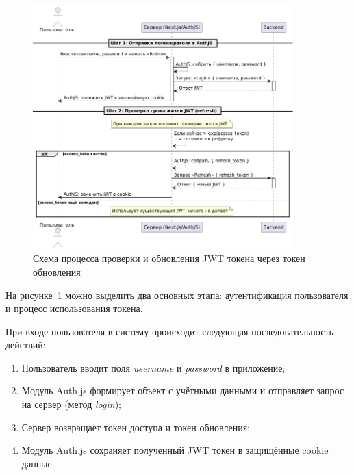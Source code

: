 \begin{figure}[h]
    \centering
    \includegraphics[width=0.9\textwidth]{static/diagrams/AuthRefresh.png}
    \caption{Схема процесса проверки и обновления JWT токена через токен обновления}
    \label{fig:auth-refresh}
\end{figure}

На рисунке~\ref{fig:auth-refresh} можно выделить два основных этапа: аутентификация пользователя и процесс использования токена.

При входе пользователя в систему происходит следующая последовательность действий:
\begin{enumerate}
    \item Пользователь вводит поля \textit{username} и \textit{password} в приложение;
    \item Модуль Auth.js формирует объект с учётными данными и отправляет запрос на сервер (метод \textit{login});
    \item Сервер возвращает токен доступа и токен обновления;
    \item Модуль Auth.js сохраняет полученный JWT токен в защищённые cookie данные.
\end{enumerate}

